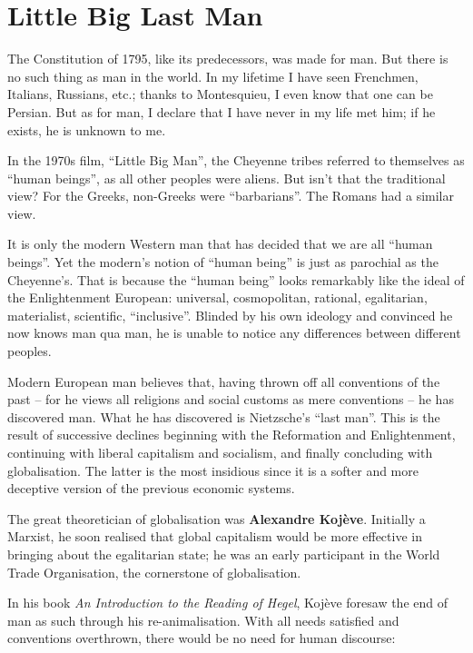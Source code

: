 \section{Little Big Last Man}

\begin{quotex}
The Constitution of 1795, like its predecessors, was made for man. But there is no such thing as man in the world. In my lifetime I have seen Frenchmen, Italians, Russians, etc.; thanks to Montesquieu, I even know that one can be Persian. But as for man, I declare that I have never in my life met him; if he exists, he is unknown to me.
\end{quotex}


In the 1970s film, ``Little Big Man'', the Cheyenne tribes referred to themselves as ``human beings'', as all other peoples were aliens. But isn't that the traditional view? For the Greeks, non-Greeks were ``barbarians''. The Romans had a similar view.

It is only the modern Western man that has decided that we are all ``human beings''. Yet the modern's notion of ``human being'' is just as parochial as the Cheyenne's. That is because the ``human being'' looks remarkably like the ideal of the Enlightenment European: universal, cosmopolitan, rational, egalitarian, materialist, scientific, ``inclusive''. Blinded by his own ideology and convinced he now knows man qua man, he is unable to notice any differences between different peoples.

Modern European man believes that, having thrown off all conventions of the past -- for he views all religions and social customs as mere conventions -- he has discovered man. What he has discovered is Nietzsche's ``last man''. This is the result of successive declines beginning with the Reformation and Enlightenment, continuing with liberal capitalism and socialism, and finally concluding with globalisation. The latter is the most insidious since it is a softer and more deceptive version of the previous economic systems.

The great theoretician of globalisation was \textbf{Alexandre Kojève}. Initially a Marxist, he soon realised that global capitalism would be more effective in bringing about the egalitarian state; he was an early participant in the World Trade Organisation, the cornerstone of globalisation.

In his book \emph{An Introduction to the Reading of Hegel}, Kojève foresaw the end of man as such through his re-animalisation. With all needs satisfied and conventions overthrown, there would be no need for human discourse:

